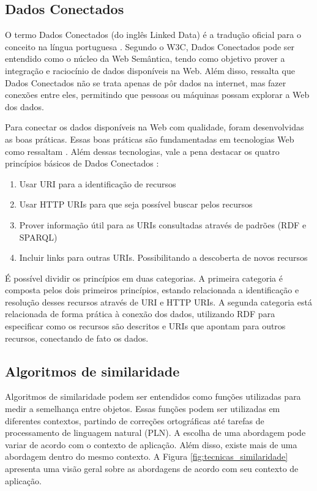 \subsection{Dados Conectados}
O termo Dados Conectados (do inglês Linked Data) é a tradução oficial para o conceito na língua portuguesa \cite{Isotani2015}. Segundo o W3C, Dados Conectados pode ser entendido como o núcleo da Web Semântica, tendo como objetivo prover a integração e raciocínio de dados disponíveis na Web. Além disso,  ressalta que Dados Conectados não se trata apenas de pôr dados na internet, mas fazer conexões entre eles, permitindo que pessoas ou máquinas possam explorar a Web dos dados.

Para conectar os dados disponíveis na Web com qualidade, foram desenvolvidas as boas práticas. Essas boas práticas são fundamentadas em tecnologias Web como ressaltam . Além dessas tecnologias, vale a pena destacar os quatro princípios básicos de Dados Conectados \cite{berners2006linked}: 

\begin{enumerate}
	\item Usar URI para a identificação de recursos
	\item Usar HTTP URIs para que seja possível buscar pelos recursos 
	\item Prover informação útil para as URIs consultadas através de padrões (RDF e SPARQL) 
	\item Incluir links para outras URIs. Possibilitando a descoberta de novos recursos
\end{enumerate}

É possível dividir os princípios em duas categorias. A primeira categoria é composta pelos dois primeiros princípios, estando relacionada a identificação e resolução desses recursos através de URI e HTTP URIs. A segunda categoria está relacionada de forma prática à conexão dos dados, utilizando RDF para especificar como os recursos são descritos e URIs que apontam para outros recursos, conectando de fato os dados.

\subsection{Algoritmos de similaridade}

Algoritmos de similaridade podem ser entendidos como funções utilizadas para medir a semelhança entre objetos. Essas funções podem ser utilizadas em diferentes contextos, partindo de correções ortográficas até tarefas de processamento de linguagem natural (PLN). A escolha de uma abordagem pode variar de acordo com o contexto de aplicação. Além disso, existe mais de uma abordagem dentro do mesmo contexto. A Figura \ref{fig:tecnicas_similaridade} apresenta uma visão geral sobre as abordagens de acordo com seu contexto de aplicação. 


